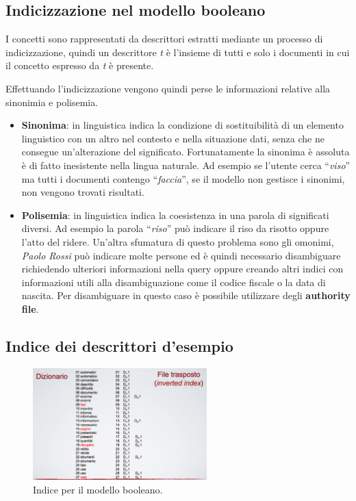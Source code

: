 \subsection{Indicizzazione nel modello booleano}

I concetti sono rappresentati da descrittori estratti mediante un processo di indicizzazione, quindi un descrittore \textit{t} è l'insieme di tutti e solo i documenti in cui il concetto espresso da \textit{t} è presente.

Effettuando l'indicizzazione vengono quindi perse le informazioni relative alla sinonimia e polisemia.

\begin{itemize}
	\item \textbf{Sinonima}: in linguistica indica la condizione di sostituibilità di un elemento linguistico con un altro nel contesto e nella situazione dati, senza che ne consegue un'alterazione del significato. Fortunatamente la sinonima è assoluta è di fatto inesistente nella lingua naturale. Ad esempio se l'utente cerca ``\textit{viso}'' ma tutti i documenti contengo ``\textit{faccia}'', se il modello non gestisce i sinonimi, non vengono trovati risultati.
	\item \textbf{Polisemia}: in linguistica indica la coesistenza in una parola di significati diversi. Ad esempio la parola ``\textit{riso}'' può indicare il riso da risotto oppure l'atto del ridere. Un'altra sfumatura di questo problema sono gli omonimi, \textit{Paolo Rossi} può indicare molte persone ed è quindi necessario disambiguare richiedendo ulteriori informazioni nella query oppure creando altri indici con informazioni utili alla disambiguazione come il codice fiscale o la data di nascita. Per disambiguare in questo caso è possibile utilizzare degli \textbf{authority file}.
\end{itemize}

\subsection{Indice dei descrittori d'esempio}

\begin{figure}[htbp]
	\centering
	\includegraphics[width=0.6\textwidth]{./images/l7-index-bool}
	\caption{Indice per il modello booleano.}
\end{figure}

